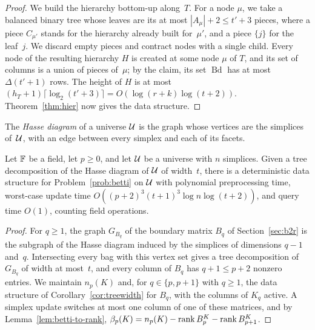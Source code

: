 \begin{proof}
We build the hierarchy bottom-up along~$T$.
For a node $\mu$, we take a balanced binary tree whose leaves are its at most $|A_\mu|+2\le t'+3$ pieces, where a piece $C_{\mu'}$ stands for the hierarchy already built for~$\mu'$, and a piece $\{j\}$ for the leaf~$j$.
We discard empty pieces and contract nodes with a single child.
Every node of the resulting hierarchy $H$ is created at some node $\mu$ of $T$, and its set of columns is a union of pieces of~$\mu$; by the claim, its set $\operatorname{Bd}$ has at most $\Delta(t'+1)$ rows.
The height of $H$ is at most $(h_T+1)\lceil\log_2(t'+3)\rceil=O(\log(r+k)\log(t+2))$.
Theorem~\ref{thm:hier} now gives the data structure.
\end{proof}

The \emph{Hasse diagram} of a universe $\mathcal{U}$ is the graph whose vertices are the simplices of~$\mathcal{U}$, with an edge between every simplex and each of its facets.

\begin{corollary}\label{cor:tw-betti}
Let $\mathbb{F}$ be a field, let $p\ge0$, and let $\mathcal{U}$ be a universe with $n$ simplices.
Given a tree decomposition of the Hasse diagram of $\mathcal{U}$ of width~$t$, there is a deterministic data structure for Problem~\ref{prob:betti} on $\mathcal{U}$ with polynomial preprocessing time, worst-case update time \mbox{$O((p+2)^3(t+1)^3\log n\log(t+2))$}, and query time $O(1)$, counting field operations.
\end{corollary}

\begin{proof}
For $q\ge1$, the graph $G_{B_q}$ of the boundary matrix $B_q$ of Section~\ref{sec:b2r} is the subgraph of the Hasse diagram induced by the simplices of dimensions $q-1$ and~$q$.
Intersecting every bag with this vertex set gives a tree decomposition of $G_{B_q}$ of width at most~$t$, and every column of $B_q$ has $q+1\le p+2$ nonzero entries.
We maintain $n_p(K)$ and, for $q\in\{p,p+1\}$ with $q\ge1$, the data structure of Corollary~\ref{cor:treewidth} for $B_q$, with the columns of $K_q$ active.
A simplex update switches at most one column of one of these matrices, and by Lemma~\ref{lem:betti-to-rank}, $\beta_p(K)=n_p(K)-\operatorname{rank} B_p^K-\operatorname{rank} B_{p+1}^K$.
\end{proof}

